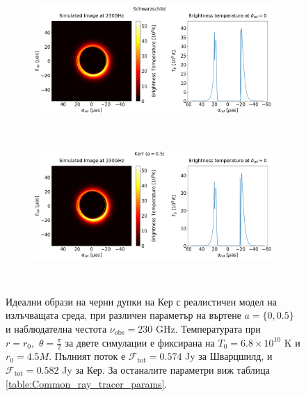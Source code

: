 \begin{figure}[h!]
	\centering
	\begin{subfigure}{12cm}
		\hspace{-1cm}
		\includegraphics[scale = 0.3]{Ray_tracer_plot_230_Sch.png}
	\end{subfigure}\\
	\begin{subfigure}{12cm}
		\hspace{-1cm}
		\includegraphics[scale = 0.3]{Ray_tracer_plot_230_Kerr_0.5.png}
	\end{subfigure}\\
	\label{Kerr_Ray_tracer_230}
	\caption[Идеални образи на черни дупки на Кер с реалистичен модел на излъчващата среда, при различен параметър на въртене $a$, и наблюдателна честота $\nu_\text{obs} = 230$ GHz]{\small Идеални образи на черни дупки на Кер с реалистичен модел на излъчващата среда, при различен параметър на въртене $a = \{0, 0.5\}$ и наблюдателна честота $\nu_\text{obs} = 230$ GHz. Температурата при $r = r_0,\,\,\theta = \frac{\pi}{2}$ за двете симулации е фиксирана на $T_0 = 6.8\times10^{10}$ K и $r_0 = 4.5M$. Пълният поток е $\mathcal{F}_{\text{tot}} = 0.574$ Jy за Шварцшилд, и $\mathcal{F}_{\text{tot}} = 0.582$ Jy за Кер. За останалите параметри виж таблица \ref{table:Common_ray_tracer_params}.} 
\end{figure}

